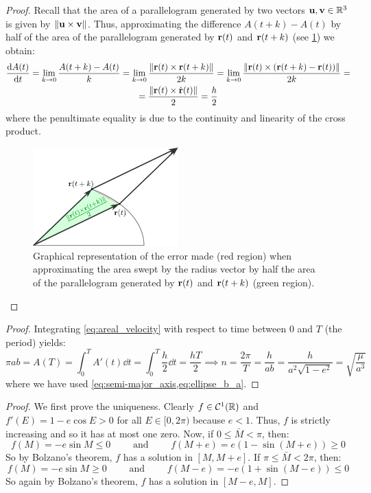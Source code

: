 \documentclass[../main.tex]{subfiles}
\begin{document}
\keplerB*
\begin{proof}
  Recall that the area of a parallelogram generated by two vectors $\boldsymbol{\mathrm{u}},\boldsymbol{\mathrm{v}}\in\mathbb{R}^3$ is given by $\left\|\boldsymbol{\mathrm{u}}\times\boldsymbol{\mathrm{v}}\right\|$. Thus, approximating the difference $A(t+k)-A(t)$ by half of the area of the parallelogram generated by $\boldsymbol{\mathrm{r}}(t)$ and ${\boldsymbol{\mathrm{r}}}(t+k)$ (see \cref{fig:areal_vel}) we obtain:
  \begin{multline}
    \dv{A(t)}{t}=\lim_{k\to 0}\frac{A(t+k)-A(t)}{k}=\lim_{k\to 0}\frac{\left\|\boldsymbol{\mathrm{r}}(t)\times\boldsymbol{\mathrm{r}}(t+k)\right\|}{2k}=\lim_{k\to 0}\frac{\left\|\boldsymbol{\mathrm{r}}(t)\times(\boldsymbol{\mathrm{r}}(t+k)-\boldsymbol{\mathrm{r}}(t))\right\|}{2k}=\\
    =\frac{\left\|\boldsymbol{\mathrm{r}}(t)\times\dot{\boldsymbol{\mathrm{r}}}(t)\right\|}{2}=\frac{h}{2}
  \end{multline}
  where the penultimate equality is due to the continuity and linearity of the cross product.
  \begin{figure}[htbp]
    \centering
    \includegraphics[width=0.5\textwidth]{Images/areal_velocity.pdf}
    \caption{Graphical representation of the error made (red region) when approximating the area swept by the radius vector by half the area of the parallelogram generated by $\boldsymbol{\mathrm{r}}(t)$ and $\boldsymbol{\mathrm{r}}(t+k)$ (green region).}
    \label{fig:areal_vel}
  \end{figure}
\end{proof}
\keplerC*
\begin{proof}
  Integrating \cref{eq:areal_velocity} with respect to time between 0 and $T$ (the period) yields:
  \begin{equation}
    \pi a b=A(T)=\int_0^T A'(t)\dd{t}=\int_0^T \frac{h}{2}\dd{t}=\frac{hT}{2}\implies n=\frac{2\pi}{T}=\frac{h}{a b}=\frac{h}{a^2\sqrt{1-e^2}}=\sqrt{\frac{\mu}{a^3}}
  \end{equation}
  where we have used \cref{eq:semi-major_axis,eq:ellipse_b_a}.
\end{proof}
\keplerequation*
\begin{proof}
  We first prove the uniqueness. Clearly $f\in\mathcal{C}^1(\mathbb{R})$ and $f'(E)=1-e\cos E> 0$ for all $E\in[0,2\pi)$ because $e<1$. Thus, $f$ is strictly increasing and so it has at most one zero. Now, if $0\leq \bar{M}< \pi$, then:
  \begin{equation}
    f(M)=-e\sin M\leq 0\qquad\text{ and }\qquad f(M+e)=e(1-\sin (M+e))\geq 0
  \end{equation}
  So by Bolzano's theorem, $f$ has a solution in $[M,M+e]$. If $\pi\leq \bar{M}< 2\pi$, then:
  \begin{equation}
    f(M)=-e\sin M\geq 0\qquad\text{ and }\qquad f(M-e)=-e(1+\sin (M-e))\leq 0
  \end{equation}
  So again by Bolzano's theorem, $f$ has a solution in $[M-e,M]$.
\end{proof}
\end{document}

